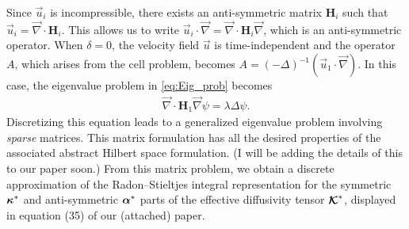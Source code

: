 \documentclass{article}
\newcommand{\Hb}{\mathbf{H}}
\newcommand\bkappa{\mbox{\boldmath${\kappa}$}}
\newcommand\balpha{\mbox{\boldmath${\alpha}$}}
\newcommand\Kbc{\mbox{\boldmath${\mathcal{K}}$}}
\newcommand{\0}{\mathbf{0}}
\newcommand{\1}{\mathbf{1}}
\newcommand{\2}{\mathbf{2}}
\newcommand{\3}{\mathbf{3}}
\newcommand{\4}{\mathbf{4}}
\newcommand{\5}{\mathbf{5}}
\newcommand{\6}{\mathbf{6}}
\newcommand{\7}{\mathbf{7}}
\newcommand{\8}{\mathbf{8}}
\begin{document}
Since $\vec{u}_i$ is incompressible, there exists
an anti-symmetric matrix $\Hb_i$ such that
$\vec{u}_i=\vec{\nabla}\cdot\Hb_i$. This allows us to write
$\vec{u}_i\cdot\vec{\nabla}=\vec{\nabla}\cdot\Hb_i\vec{\nabla}$, which is an anti-symmetric
operator. When $\delta=0$, the velocity field $\vec{u}$ is time-independent
and the operator $A$, which arises from the cell problem, becomes
$A=(-\Delta)^{-1}(\vec{u}_1\cdot\vec{\nabla})$. In this case, the eigenvalue problem in
\eqref{eq:Eig_prob} becomes 
%
\begin{align}\label{eq:Eig_prob_steady}
  \vec{\nabla}\cdot\Hb_1\vec{\nabla}\psi=\lambda\Delta\psi.
\end{align}
%
Discretizing this equation leads to a generalized eigenvalue
problem involving \emph{sparse} matrices. This matrix formulation has
all the desired properties of the associated abstract Hilbert space
formulation. (I will be adding the details of this to our paper soon.)
From this matrix problem, we obtain a discrete approximation of the
Radon--Stieltjes integral representation for the symmetric $\bkappa^*$
and anti-symmetric $\balpha^*$ parts of the effective diffusivity
tensor $\Kbc^*$, displayed in equation (35) of our (attached) paper.  
\end{document}
